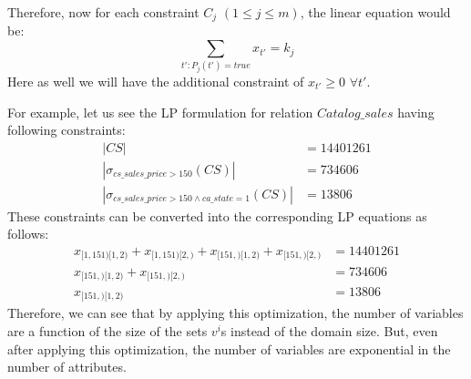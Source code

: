 \documentclass[]{article}
\begin{document}
\begin{multicols}{2}
			Therefore, now for each constraint $C_{j}$ $(1 \leq j \leq m)$, the linear equation would be:
			\begin{equation*}
				\sum_{t':P_{j}(t')=true} x_{t'} = k_{j}
			\end{equation*}
			Here as well we will have the additional constraint of $x_{t'} \ge 0$ $\forall t'$.
			
			For example, let us see the LP formulation for relation $Catalog\_sales$ having following constraints:
			{\small
			\begin{align*}
				|CS| & = 14401261 \\
				|\sigma_{cs\_sales\_price > 150} (CS)| & = 734606 \\
				|\sigma_{cs\_sales\_price > 150 \wedge ca\_state = 1} (CS)| & = 13806
			\end{align*}
			}
			These constraints can be converted into the corresponding LP equations as follows:
			{\small
			\begin{align*}
				x_{[1,151)[1,2)} + x_{[1,151)[2,)} + x_{[151,)[1,2)} + x_{[151,)[2,)} & = 14401261	\\
				x_{[151,)[1,2)} + x_{[151,)[2,)} & = 734606 \\
				x_{[151,)[1,2)} & = 13806
			\end{align*}
			}
			Therefore, we can see that by applying this optimization, the number of variables are a function of the size of the sets $v^{i}$s instead of the domain size. 
			But, even after applying this optimization, the number of variables are exponential in the number of attributes. 
			
			

\end{multicols}
\end{document}
